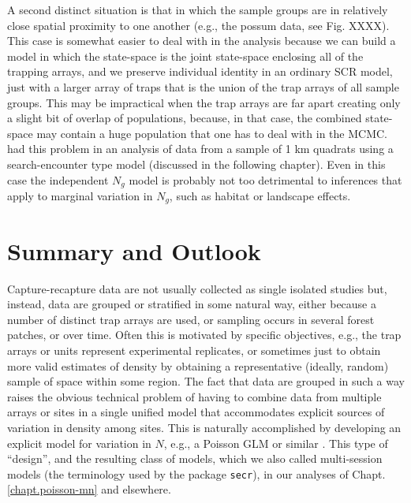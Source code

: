 A second distinct situation is that in which the sample groups are in 
relatively close spatial proximity to one another (e.g., the possum
data, see Fig. XXXX). This case is somewhat easier to deal with in the
analysis because we can build a model in which the state-space is the
joint state-space enclosing all of the trapping arrays, and we
preserve individual identity in an ordinary SCR model, just with
a larger array of traps that is the union of the trap arrays of all
sample groups. This may be impractical when the trap arrays are far
apart creating only a slight bit of overlap of populations, because,
in that case, the combined state-space may contain a huge population
that one has to deal with in the MCMC.  \citep{royle_etal:2011mee} had
this problem in an analysis of data from a sample of 1 km quadrats
using a search-encounter type model (discussed in the following
chapter).
Even in this case the independent $N_{g}$ model is probably not too
detrimental to inferences that apply to marginal variation in $N_{g}$,
such as habitat or landscape effects. 









\section{Summary and Outlook}

Capture-recapture data are not usually collected as single isolated
studies but, instead, data are grouped or stratified in some natural
way, either because a number of distinct trap arrays are used, or
sampling occurs in several forest patches, or over time. Often this is
motivated by specific objectives, e.g., the trap arrays or units
represent experimental replicates, or sometimes just to obtain more
valid estimates of density by obtaining a representative (ideally,
random) sample of space within some region.  The fact that data are
grouped in such a way raises the obvious technical problem of having
to combine data from multiple arrays or sites in a single unified
model that accommodates explicit sources of variation in density among
sites.  This is naturally accomplished by developing an explicit model
for variation in $N$, e.g., a Poisson GLM or similar
\citep{converse_royle:2012, royle_etal:2012arXiv}. This type of ``design'', and
the resulting class of models, which we also called multi-session
models (the terminology used by
the package \mbox{\tt secr}), in our analyses of
Chapt. \ref{chapt.poisson-mn} and elsewhere.

